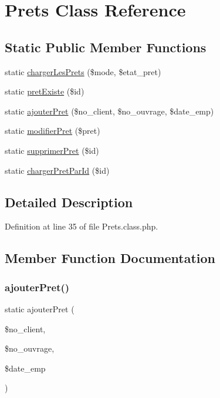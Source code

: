 \hypertarget{class_prets}{}\section{Prets Class Reference}
\label{class_prets}
\subsection*{Static Public Member Functions}
\begin{DoxyCompactItemize}
\item 
static \hyperlink{class_prets_a8a173fad71ea1b75ea7fb092732bd7fb}{charger\+Les\+Prets} (\$mode, \$etat\+\_\+pret)
\item 
static \hyperlink{class_prets_ae2e15f8376a62a7e410b70431a365e4f}{pret\+Existe} (\$id)
\item 
static \hyperlink{class_prets_af21bb9078a59c621c5539fd14716e689}{ajouter\+Pret} (\$no\+\_\+client, \$no\+\_\+ouvrage, \$date\+\_\+emp)
\item 
static \hyperlink{class_prets_a71f7b77d9ff38020ab022389dda0e226}{modifier\+Pret} (\$pret)
\item 
static \hyperlink{class_prets_a319222a4f2442b93068fadd2a5bb7d2d}{supprimer\+Pret} (\$id)
\item 
static \hyperlink{class_prets_a7ea0e0fc80de1d6df26d9a8e0017ff92}{charger\+Pret\+Par\+Id} (\$id)
\end{DoxyCompactItemize}


\subsection{Detailed Description}


Definition at line 35 of file Prets.\+class.\+php.



\subsection{Member Function Documentation}
\mbox{\label{class_prets_af21bb9078a59c621c5539fd14716e689}} 
\subsubsection{\texorpdfstring{ajouter\+Pret()}{ajouterPret()}}
{\footnotesize\ttfamily static ajouter\+Pret (\begin{DoxyParamCaption}\item[{}]{\$no\+\_\+client,  }\item[{}]{\$no\+\_\+ouvrage,  }\item[{}]{\$date\+\_\+emp }\end{DoxyParamCaption})\hspace{0.3cm}{\ttfamily [static]}}

